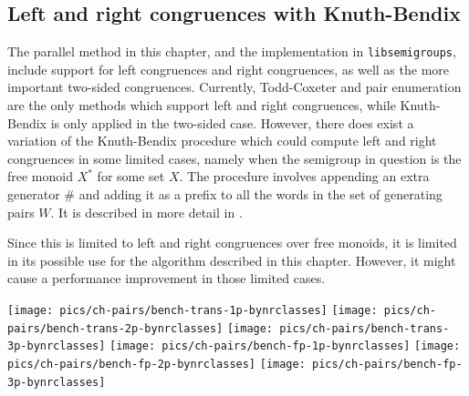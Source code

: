 \subsection{Left and right congruences with Knuth-Bendix}
\label{sec:kb-l-r}
The parallel method in this chapter, and the implementation in
\texttt{libsemigroups}, include support for left congruences and right
congruences, as well as the more important two-sided congruences.  Currently,
Todd-Coxeter and pair enumeration are the only methods which support left and
right congruences, while Knuth-Bendix is only applied in the two-sided case.
However, there does exist a variation of the Knuth-Bendix procedure which could
compute left and right congruences in some limited cases, namely when the
semigroup in question is the free monoid $X^*$ for some set $X$.  The procedure
involves appending an extra generator $\#$ and adding it as a prefix to all the
words in the set of generating pairs $W$.  It is described in more detail in
\cite[\S 2.8]{sims}.

Since this is limited to left and right congruences over free monoids, it is
limited in its possible use for the algorithm described in this chapter.
However, it might cause a performance improvement in those limited cases.



\clearpage

\texttt{[image: pics/ch-pairs/bench-trans-1p-bynrclasses]}
\texttt{[image: pics/ch-pairs/bench-trans-2p-bynrclasses]}
\texttt{[image: pics/ch-pairs/bench-trans-3p-bynrclasses]}
\texttt{[image: pics/ch-pairs/bench-fp-1p-bynrclasses]}
\texttt{[image: pics/ch-pairs/bench-fp-2p-bynrclasses]}
\texttt{[image: pics/ch-pairs/bench-fp-3p-bynrclasses]}
